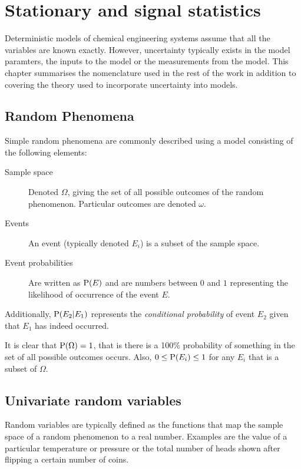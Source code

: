 \chapter{Stationary and signal statistics}\label{chap:stats}
\begin{overview} 
  Deterministic models of chemical engineering systems assume that all the variables are known exactly.
  However, uncertainty typically exists in the model paramters, the inputs to the model or the measurements from the model.
  This chapter summarises the nomenclature used in the rest of the work in addition to covering the theory used to incorporate uncertainty into models.
\end{overview}

\section{Random Phenomena}
\label{sec:statistisc:probability}
Simple random phenomena are commonly described using a model consisting of the following elements:\citep[1]{kulkarni1999modeling}
\begin{description}
\item[Sample space] Denoted $\Omega$, giving the set of all possible outcomes of the random phenomenon.  
  Particular outcomes are denoted $\omega$.
\item[Events] An event (typically denoted $E_i$) is a subset of the sample space.
\item[Event probabilities] Are written as $\mathrm{P}(E)$ and are numbers between $0$ and $1$ representing the likelihood of occurrence of the event $E$.
\end{description}

Additionally, $\mathrm{P}(E_2|E_1)$  represents the \emph{conditional probability} of event $E_2$ given that $E_1$ has indeed occurred.

It is clear that $\mathrm{P}(\Omega)=1$, that is there is a 100\% probability of something in the set of all possible outcomes occurs.
Also, $0 \leq \mathrm{P}(E_i) \leq 1$ for any $E_i$ that is a subset of $\Omega$.

\section{Univariate random variables}
\label{sec:univ-rand-vari}
Random variables are typically defined as the functions that map the sample space of a random phenomenon to a real number.
Examples are the value of a particular temperature or pressure or the total number of heads shown after flipping a certain number of coins.


